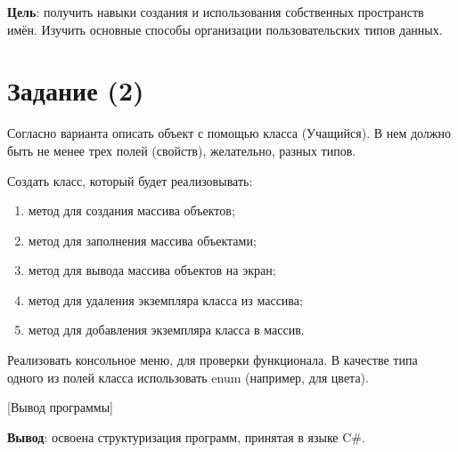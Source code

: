 \documentclass{bsuir}
\newcommand{\csharp}{C{\liberationrm\#}}
\begin{document}
\maketitle
\mainmatter
\renewcommand{\thefigure}{\arabic{figure}}
\renewcommand{\thelisting}{\arabic{listing}}

\textbf{Цель}: получить навыки создания и использования собственных пространств
имён. Изучить основные способы организации пользовательских типов данных.

\section*{Задание (2)}

Согласно варианта описать объект с помощью класса (Учащийся). В нем должно быть
не менее трех полей (свойств), желательно, разных типов.

Создать класс, который будет реализовывать:

\begin{enumerate}
    \item метод для создания массива объектов;
    \item метод для заполнения массива объектами;
    \item метод для вывода массива объектов на экран;
    \item метод для удаления экземпляра класса из массива;
    \item метод для добавления экземпляра класса в массив.
\end{enumerate}

Реализовать консольное меню, для проверки функционала. В качестве типа одного из
полей класса использовать enum (например, для цвета).


[Вывод программы]

\textbf{Вывод}: освоена структуризация программ, принятая в языке \csharp.
\end{document}
